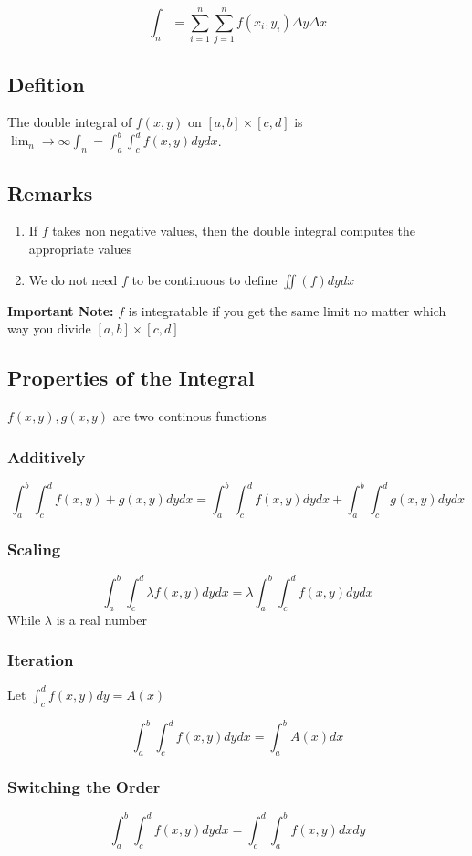\documentclass[12pt, oneside]{article}
\begin{document}
\[\int_n = \sum_{i=1}^{n} \sum_{j=1}^{n} f(x_i , y_i) \Delta y \Delta x\]

\subsection*{Defition}
The double integral of $f(x,y)$ on $[a,b]\times [c,d]$ is $\lim_n\rightarrow\infty \int_n = \int_a^b \int_c^d f(x,y) dydx$.

\subsection*{Remarks}
\begin{enumerate}
    \item If $f$ takes non negative values, then the double integral computes the appropriate values
    \item We do not need $f$ to be continuous to define $\iint (f) dydx$
\end{enumerate}

\textbf{Important Note:} $f$ is integratable if you get the same limit no matter which way you divide $[a,b]\times[c,d]$

\subsection*{Properties of the Integral}
$f(x,y),g(x,y)$ are two continous functions

\subsubsection*{Additively}
\[\int^{b}_{a}\int^{d}_{c} f(x,y) +g(x,y) dydx = \int^{b}_{a}\int^{d}_{c}f(x,y) dydx +\int^{b}_{a}\int^{d}_{c} g(x,y) dydx\]

\subsubsection*{Scaling}
\[\int^{b}_{a}\int^{d}_{c}\lambda f(x,y) dydx = \lambda \int^{b}_{a}\int^{d}_{c} f(x,y) dydx\]
While $\lambda$ is a real number

\subsubsection*{Iteration}
Let $\int^{d}_c f(x,y)dy = A(x)$

\[\int^{b}_{a}\int^{d}_{c} f(x,y)dydx = \int_a^b A(x)dx\]

\subsubsection*{Switching the Order}
\[\int^{b}_{a}\int^{d}_{c} f(x,y)dydx = \int^{d}_{c}\int^{b}_{a} f(x,y) dxdy\]
\end{document}
